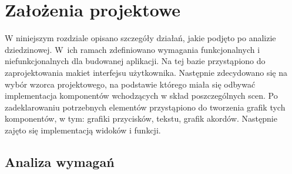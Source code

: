 \chapter{Założenia projektowe}
W niniejszym rozdziale opisano szczegóły działań, jakie podjęto po analizie dziedzinowej. W~ich ramach zdefiniowano wymagania funkcjonalnych i niefunkcjonalnych dla budowanej aplikacji. Na tej bazie przystąpiono do zaprojektowania makiet interfejsu użytkownika. Następnie zdecydowano się na wybór wzorca projektowego, na podstawie którego miała się odbywać implementacja komponentów wchodzących w skład poszczególnych scen. Po zadeklarowaniu potrzebnych elementów przystąpiono do tworzenia grafik tych komponentów, w tym: grafiki przycisków, tekstu, grafik akordów. Następnie zajęto się implementacją widoków i funkcji. 

\section{Analiza wymagań}
